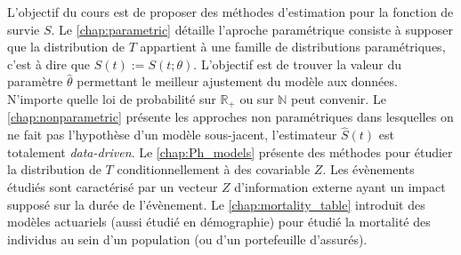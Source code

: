 L'objectif du cours est de proposer des méthodes d'estimation pour la fonction de survie $S$. Le \cref{chap:parametric} détaille l'aproche paramétrique consiste à supposer que la distribution de $T$ appartient à une famille de distributions paramétriques, c'est à dire que $S(t) := S(t;\theta)$. L'objectif est de trouver la valeur du paramètre $\widehat{\theta}$ permettant le meilleur ajustement du modèle aux données.  N'importe quelle loi de probabilité sur $\mathbb{R}_+$ ou sur $\mathbb{N}$ peut convenir. Le \cref{chap:nonparametric} présente les approches non paramétriques dans lesquelles on ne fait pas l'hypothèse d'un modèle sous-jacent, l'estimateur $\widehat{S}(t)$ est totalement \textit{data-driven}. Le \cref{chap:Ph_models} présente des méthodes pour étudier la distribution de $T$ conditionnellement à des covariable $Z$. Les évènements étudiés sont caractérisé par un vecteur $Z$ d'information externe ayant un impact supposé sur la durée de l'évènement. Le \cref{chap:mortality_table}
introduit des modèles actuariels (aussi étudié en démographie) pour étudié la mortalité des individus au sein d'un population (ou d'un portefeuille d'assurés). 
